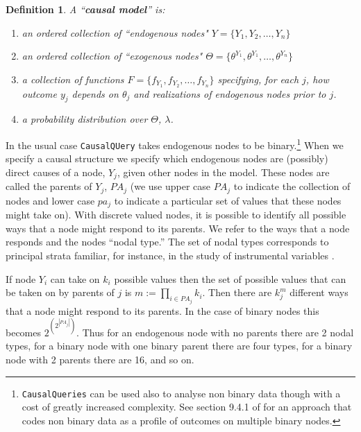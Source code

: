 \documentclass[
  11pt,
  article]{jss}
\newtheorem{definition}{Definition}
\begin{document}
\begin{definition}
  
  A ``\textbf{causal model}'' is:
  \begin{enumerate}
    \item an ordered collection of ``endogenous nodes" $Y = \{Y_1, Y_2, \dots, Y_n\}$
    \item an ordered collection of ``exogenous nodes" $\Theta = \{\theta^{Y_1}, \theta^{Y_1}, \dots, \theta^{Y_n}\}$
    \item a collection of functions $F = \{f_{Y_1}, f_{Y_2}, \dots, f_{Y_n}\}$ specifying, for each $j$, how outcome $y_j$ depends on $\theta_j$ and realizations of endogenous nodes prior to $j$.
    \item a probability distribution over $\Theta$, $\lambda$.
  \end{enumerate}
  
\end{definition}

In the usual case \texttt{CausalQUery} takes endogenous nodes to be
binary.\footnote{\texttt{CausalQueries} can be used also to analyse non
  binary data though with a cost of greatly increased complexity. See
  section 9.4.1 of \citet{ii2023} for an approach that codes non binary
  data as a profile of outcomes on multiple binary nodes.} When we
specify a causal structure we specify which endogenous nodes are
(possibly) direct causes of a node, \(Y_j\), given other nodes in the
model. These nodes are called the parents of \(Y_j\), \(PA_j\) (we use
upper case \(PA_j\) to indicate the collection of nodes and lower case
\(pa_j\) to indicate a particular set of values that these nodes might
take on). With discrete valued nodes, it is possible to identify all
possible ways that a node might respond to its parents. We refer to the
ways that a node responds and the nodes ``nodal type.'' The set of nodal
types corresponds to principal strata familiar, for instance, in the
study of instrumental variables \citep{frangakis2002principal}.

If node \(Y_i\) can take on \(k_i\) possible values then the set of
possible values that can be taken on by parents of \(j\) is
\(m :=\prod_{i\in PA_j}k_i\). Then there are \(k_j^{m}\) different ways
that a node might respond to its parents. In the case of binary nodes
this becomes \(2^{\left(2^{|PA_j|}\right)}\). Thus for an endogenous
node with no parents there are 2 nodal types, for a binary node with one
binary parent there are four types, for a binary node with 2 parents
there are 16, and so on.
\end{document}
